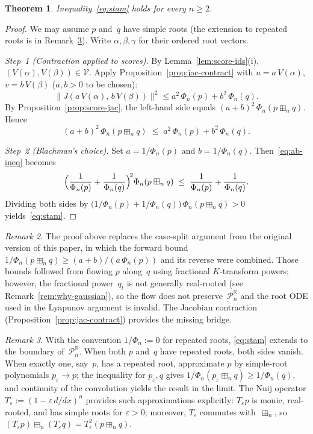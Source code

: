 \documentclass[11pt,a4paper]{amsart}
\theoremstyle{plain}
\newtheorem{theorem}{Theorem}[section]
\theoremstyle{definition}
\theoremstyle{remark}
\newtheorem{remark}[theorem]{Remark}
\newcommand{\R}{\mathbb{R}}
\newcommand{\PnR}[1][n]{\mathcal{P}^{\R}_{#1}}
\newcommand{\fp}{\boxplus_n}
\begin{document}
\begin{theorem}\label{thm:full-stam}
Inequality~\eqref{eq:stam} holds for every $n\ge 2$.
\end{theorem}

\begin{proof}
We may assume $p$ and~$q$ have simple roots
(the extension to repeated roots is in
Remark~\ref{rem:boundary}).
Write $\alpha,\beta,\gamma$ for their ordered root vectors.

\emph{Step~1 (Contraction applied to scores).}
By Lemma~\ref{lem:score-ids}(i),
$(V(\alpha),V(\beta))\in\mathcal{V}$.
Apply Proposition~\ref{prop:jac-contract} with
$u=a\,V(\alpha)$, $v=b\,V(\beta)$ ($a,b>0$ to be
chosen):
\[
  \bigl\|J(a\,V(\alpha),\,b\,V(\beta))\bigr\|^2
  \le a^2\,\Phi_n(p)+b^2\,\Phi_n(q).
\]
By Proposition~\ref{prop:score-jac}, the left-hand side
equals $(a+b)^2\,\Phi_n(p\fp q)$.
Hence
\begin{equation}\label{eq:ab-ineq}
  (a+b)^2\,\Phi_n(p\fp q)
  \;\le\;a^2\,\Phi_n(p)+b^2\,\Phi_n(q).
\end{equation}

\emph{Step~2 (Blachman's choice).}
Set $a=1/\Phi_n(p)$ and $b=1/\Phi_n(q)$.
Then~\eqref{eq:ab-ineq} becomes
\[
  \Bigl(\frac{1}{\Phi_n(p)}+\frac{1}{\Phi_n(q)}\Bigr)^{\!2}
  \Phi_n(p\fp q)
  \;\le\;\frac{1}{\Phi_n(p)}+\frac{1}{\Phi_n(q)}.
\]
Dividing both sides by
$\bigl(1/\Phi_n(p)+1/\Phi_n(q)\bigr)\,\Phi_n(p\fp q)>0$
yields~\eqref{eq:stam}.
\end{proof}

\begin{remark}\label{rem:old-proof}
The proof above replaces the case-split argument from
the original version of this paper, in which the forward
bound $1/\Phi_n(p\fp q)\ge(a+b)/(a\,\Phi_n(p))$ and its
reverse were combined.
Those bounds followed from flowing $p$ along~$q$
using fractional $K$-transform powers; however, the
fractional power~$q_t$ is not generally real-rooted
(see Remark~\ref{rem:why-gaussian}),
so the flow does not preserve~$\PnR$ and the root ODE
used in the Lyapunov argument is invalid.
The Jacobian contraction
(Proposition~\ref{prop:jac-contract})
provides the missing bridge.
\end{remark}

\begin{remark}\label{rem:boundary}
With the convention $1/\Phi_n:=0$ for repeated roots,
\eqref{eq:stam} extends to the boundary of~$\PnR$.
When both $p$ and~$q$ have repeated roots, both sides vanish.
When exactly one, say~$p$, has a repeated root, approximate
$p$ by simple-root polynomials $p_\varepsilon\to p$;
the inequality for $p_\varepsilon,q$ gives
$1/\Phi_n(p_\varepsilon\fp q)\ge 1/\Phi_n(q)$,
and continuity of the convolution yields the result in
the limit.
The Nuij operator $T_\varepsilon:=(1-\varepsilon\,d/dx)^n$
provides such approximations explicitly: $T_\varepsilon p$
is monic, real-rooted, and has simple roots for
$\varepsilon>0$; moreover, $T_\varepsilon$ commutes
with~$\fp$, so
$(T_\varepsilon p)\fp(T_\varepsilon q)
=T_\varepsilon^2(p\fp q)$.
\end{remark}
\end{document}
